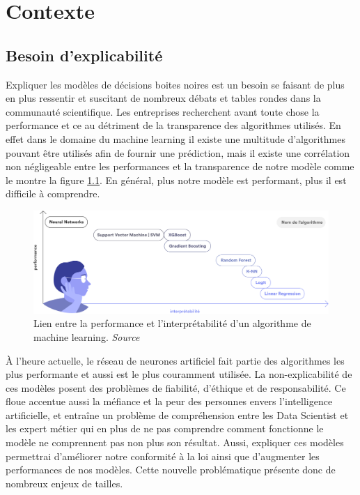 \chapter{Contexte}
\section{Besoin d'explicabilité}
Expliquer les modèles de décisions boites noires est un besoin se faisant de plus en plus ressentir et suscitant de nombreux débats et tables rondes dans la communauté scientifique. Les entreprises recherchent avant toute chose la performance et ce au détriment de la transparence des algorithmes utilisés. En effet dans le domaine du machine learning il existe une multitude d'algorithmes pouvant être utilisés afin de fournir une prédiction, mais il existe une corrélation non négligeable entre les performances et la transparence de notre modèle comme le montre la figure \ref{performanceAndInterpretabilite}. En général, plus notre modèle est performant, plus il est difficile à comprendre.\par

\begin{figure}[h]
\centering
\includegraphics[scale=0.15]{src_img/performanceAndInterpretabilite.png}
\caption{Lien entre la performance et l'interprétabilité d'un algorithme de machine learning. \textit{Source \cite{hippocrate}}}
\label{performanceAndInterpretabilite}
\end{figure}

À l'heure actuelle, le réseau de neurones artificiel fait partie des algorithmes les plus performante et aussi est le plus couramment utilisée.
La non-explicabilité de ces modèles posent des problèmes de fiabilité, d'éthique et de responsabilité. Ce floue accentue aussi la méfiance et la peur des personnes envers l'intelligence artificielle, et entraîne un problème de compréhension entre les Data Scientist et les expert métier qui en plus de ne pas comprendre comment fonctionne le modèle ne comprennent pas non plus son résultat. Aussi, expliquer ces modèles permettrai d'améliorer notre conformité à la loi ainsi que d'augmenter les performances de nos modèles. Cette nouvelle problématique présente donc de nombreux enjeux de tailles.\par

